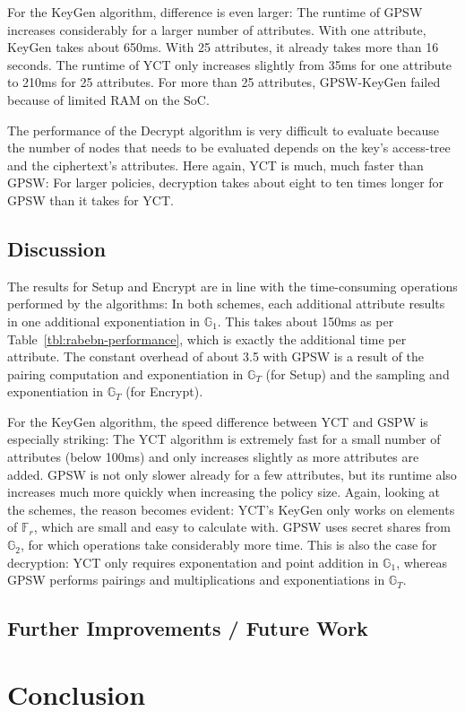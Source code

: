 For the KeyGen algorithm, difference is even larger:
The runtime of GPSW increases considerably for a larger number of attributes.
With one attribute, KeyGen takes about 650ms. With 25 attributes, it already takes more than 16 seconds.
The runtime of YCT only increases slightly from 35ms for one attribute to 210ms for 25 attributes.
For more than 25 attributes, GPSW-KeyGen failed because of limited RAM on the SoC.

The performance of the Decrypt algorithm is very difficult to evaluate because the number of nodes that needs to be evaluated depends on the key's \gls{access-tree} and the ciphertext's \glspl{attribute}.
Here again, YCT is much, much faster than GPSW: For larger policies, decryption takes about eight to ten times longer for GPSW than it takes for YCT.

\section{Discussion}
The results for Setup and Encrypt are in line with the time-consuming operations performed by the algorithms: 
In both schemes, each additional attribute results in one additional exponentiation in $\mathbb{G}_1$.
This takes about 150ms as per Table~\ref{tbl:rabebn-performance}, which is exactly the additional time per attribute.
The constant overhead of about 3.5 with GPSW is a result of the pairing computation and exponentiation in $\mathbb{G}_T$ (for Setup) and the sampling and exponentiation in $\mathbb{G}_T$ (for Encrypt).

For the KeyGen algorithm, the speed difference between YCT and GSPW is especially striking: 
The YCT algorithm is extremely fast for a small number of attributes (below 100ms) and only increases slightly as more attributes are added.
GPSW is not only slower already for a few attributes, but its runtime also increases much more quickly when increasing the policy size.
Again, looking at the schemes, the reason becomes evident: YCT's KeyGen only works on elements of $\mathbb{F}_r$, which are small and easy to calculate with.
GPSW uses secret shares from $\mathbb{G}_2$, for which operations take considerably more time.
This is also the case for decryption: YCT only requires exponentation and point addition in $\mathbb{G}_1$, whereas GPSW performs pairings and multiplications and exponentiations in $\mathbb{G}_T$.


\section{Further Improvements / Future Work}

\chapter{Conclusion}